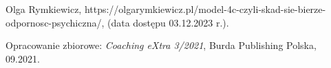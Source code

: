 \begin{thebibliography}{3}                      %
    \small
    Olga Rymkiewicz, https://olgarymkiewicz.pl/model-4c-czyli-skad-sie-bierze-odpornosc-psychiczna/, (data dostępu 03.12.2023 r.).

    Opracowanie zbiorowe: \emph{Coaching eXtra 3/2021}, Burda Publishing Polska, 09.2021.


\end{thebibliography}